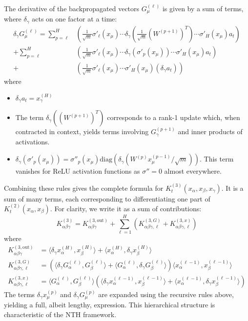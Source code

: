 \documentclass[a4paper]{article}
\begin{document}
The derivative of the backpropagated vectors $G^{(\ell)}_\mu$ is given by a sum of terms, where $\delta_\gamma$ acts on one factor at a time:
\begin{align}
\delta_\gamma G^{(\ell)}_\mu = \sum_{p=\ell}^{H} & \left( \frac{1}{\sqrt{m}}\sigma'_\ell(x_\mu) \cdots \delta_\gamma(\frac{1}{\sqrt{m}}(W^{(p+1)})^T) \cdots \sigma'_H(x_\mu) a_t \right) \\
+ \sum_{p=\ell}^{H} & \left( \frac{1}{\sqrt{m}}\sigma'_\ell(x_\mu) \cdots \delta_\gamma(\sigma'_{p}(x_\mu)) \cdots \sigma'_H(x_\mu) a_t \right) \\
+ & \left( \frac{1}{\sqrt{m}}\sigma'_\ell(x_\mu) \cdots \sigma'_H(x_\mu) (\delta_\gamma a_t) \right)
\end{align}
where
\begin{itemize}
    \item $\delta_\gamma a_t = x^{(H)}_\gamma$
    \item The term $\delta_\gamma((W^{(p+1)})^T)$ corresponds to a rank-1 update which, when contracted in context, yields terms involving $G^{(p+1)}_\gamma$ and inner products of activations.
    \item $\delta_\gamma(\sigma'_{p}(x_\mu)) = \sigma''_{p}(x_\mu) \text{diag}(\delta_\gamma(W^{(p)}x^{(p-1)}_\mu/\sqrt{m}))$. This term vanishes for ReLU activation functions as $\sigma''=0$ almost everywhere.
\end{itemize}

Combining these rules gives the complete formula for $K^{(3)}_t(x_\alpha, x_\beta, x_\gamma)$. It is a sum of many terms, each corresponding to differentiating one part of $K^{(2)}_t(x_\alpha, x_\beta)$. For clarity, we write it as a sum of contributions:
\begin{equation}
K^{(3)}_{\alpha\beta\gamma} = K^{(3, \text{out})}_{\alpha\beta\gamma} + \sum_{\ell=1}^H \left( K^{(3, G)}_{\alpha\beta\gamma, \ell} + K^{(3, x)}_{\alpha\beta\gamma, \ell} \right)
\end{equation}
where
\begin{align}
K^{(3, \text{out})}_{\alpha\beta\gamma} &= \langle \delta_\gamma x^{(H)}_\alpha, x^{(H)}_\beta \rangle + \langle x^{(H)}_\alpha, \delta_\gamma x^{(H)}_\beta \rangle \\
K^{(3, G)}_{\alpha\beta\gamma, \ell} &= \left( \langle \delta_\gamma G^{(\ell)}_\alpha, G^{(\ell)}_\beta \rangle + \langle G^{(\ell)}_\alpha, \delta_\gamma G^{(\ell)}_\beta \rangle \right) \langle x^{(\ell-1)}_\alpha, x^{(\ell-1)}_\beta \rangle \\
K^{(3, x)}_{\alpha\beta\gamma, \ell} &= \langle G^{(\ell)}_\alpha, G^{(\ell)}_\beta \rangle \left( \langle \delta_\gamma x^{(\ell-1)}_\alpha, x^{(\ell-1)}_\beta \rangle + \langle x^{(\ell-1)}_\alpha, \delta_\gamma x^{(\ell-1)}_\beta \rangle \right)
\end{align}
The terms $\delta_\gamma x^{(p)}_\mu$ and $\delta_\gamma G^{(p)}_\mu$ are expanded using the recursive rules above, yielding a full, albeit lengthy, expression. This hierarchical structure is characteristic of the NTH framework.
\end{document}
